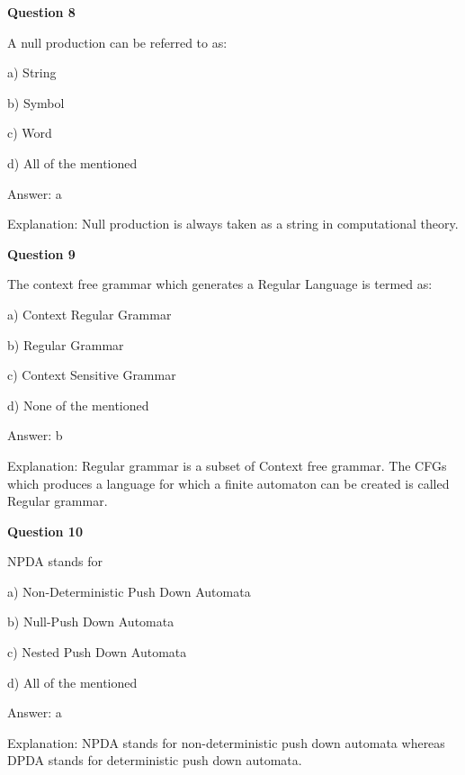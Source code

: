 \documentclass{article}
\begin{document}
\begin{mdframed}[linewidth=1pt, roundcorner=5pt, linecolor=gray!30, backgroundcolor=gray!5]
\textbf{Question 8} 

A null production can be referred to as:

a) String

b) Symbol

c) Word

d) All of the mentioned
\vspace{5pt} \par
\begin{tcolorbox}[colback=green!5, colframe=green!40!black, title=Solution]
Answer: a

Explanation: Null production is always taken as a string in computational theory.
\end{tcolorbox}
\end{mdframed}

\begin{mdframed}[linewidth=1pt, roundcorner=5pt, linecolor=gray!30, backgroundcolor=gray!5]
\textbf{Question 9} 

The context free grammar which generates a Regular Language is termed as:

a) Context Regular Grammar

b) Regular Grammar

c) Context Sensitive Grammar

d) None of the mentioned
\vspace{5pt} \par
\begin{tcolorbox}[colback=green!5, colframe=green!40!black, title=Solution]
Answer: b

Explanation: Regular grammar is a subset of Context free grammar. The CFGs which produces a language for which a finite automaton can be created is called Regular grammar.
\end{tcolorbox}
\end{mdframed}
\newpage

\begin{mdframed}[linewidth=1pt, roundcorner=5pt, linecolor=gray!30, backgroundcolor=gray!5]
\textbf{Question 10} 

NPDA stands for

a) Non-Deterministic Push Down Automata

b) Null-Push Down Automata

c) Nested Push Down Automata

d) All of the mentioned
\vspace{5pt} \par
\begin{tcolorbox}[colback=green!5, colframe=green!40!black, title=Solution]
Answer: a

Explanation: NPDA stands for non-deterministic push down automata whereas DPDA stands for deterministic push down automata.
\end{tcolorbox}
\end{mdframed}
\newpage
\end{document}
